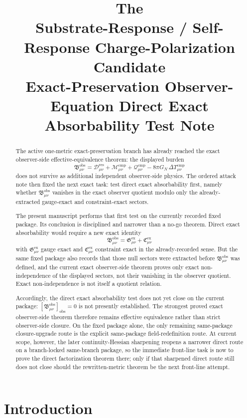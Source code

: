 \documentclass[11pt]{article}
\title{\textbf{The \TheoryName{}}\\[0.4em]
\large Substrate-Response / Self-Response Charge-Polarization Candidate\\
\large Exact-Preservation Observer-Equation Direct Exact Absorbability Test Note}
\author{}
\date{}
\newcommand{\ResidualDec}{\mathcal D_{\mu\nu}^{\mathrm{res}}}
\newcommand{\CompMix}{\mathcal M_{\mu\nu}^{\mathrm{cmp}}}
\newcommand{\CompQuad}{\mathcal Q_{\mu\nu}^{\mathrm{cmp}}}
\newcommand{\DeltaTComp}{\Delta T_{\mu\nu}^{\mathrm{cmp}}}
\newcommand{\ObsBurden}{\mathfrak B_{\mu\nu}^{\mathrm{obs}}}
\newcommand{\ObserverClass}[1]{\left[#1\right]_{\mathrm{obs}}}
\newcommand{\GaugeExact}{\mathfrak G_{\mu\nu}^{\mathrm{ex}}}
\newcommand{\ConstraintExact}{\mathfrak C_{\mu\nu}^{\mathrm{ex}}}
\begin{document}
\maketitle

\begin{abstract}
The active one-metric exact-preservation branch has already reached the exact observer-side effective-equivalence theorem: the displayed burden
\[
\ObsBurden
=
\ResidualDec+\CompMix+\CompQuad-8\pi G_N\,\DeltaTComp
\]
does not survive as additional independent observer-side physics. The ordered attack note then fixed the next exact task: test direct exact absorbability first, namely whether \(\ObsBurden\) vanishes in the exact observer quotient modulo only the already-extracted gauge-exact and constraint-exact sectors.

The present manuscript performs that first test on the currently recorded fixed package. Its conclusion is disciplined and narrower than a no-go theorem. Direct exact absorbability would require a new exact identity
\[
\ObsBurden=\GaugeExact+\ConstraintExact
\]
with \(\GaugeExact\) gauge exact and \(\ConstraintExact\) constraint exact in the already-recorded sense. But the same fixed package also records that those null sectors were extracted before \(\ObsBurden\) was defined, and the current exact observer-side theorem proves only exact non-independence of the displayed sectors, not their vanishing in the observer quotient. Exact non-independence is not itself a quotient relation.

Accordingly, the direct exact absorbability test does not yet close on the current package: \(\ObserverClass{\ObsBurden}=0\) is not presently established. The strongest proved exact observer-side theorem therefore remains effective equivalence rather than strict observer-side closure. On the fixed package alone, the only remaining same-package closure-upgrade route is the explicit same-package field-redefinition route. At current scope, however, the later continuity-Hessian sharpening reopens a narrower direct route on a branch-locked same-branch package, so the immediate front-line task is now to prove the direct factorization theorem there; only if that sharpened direct route still does not close should the rewritten-metric theorem be the next front-line attempt.
\end{abstract}

\section{Introduction}
\end{document}

